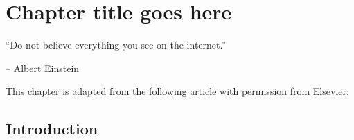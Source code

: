 \chapter{Chapter title goes here} \label{chap:chap-2}



\epigraph{\enquote{Do not believe everything you see on the internet.}}{-- Albert Einstein}




\begin{onehalfspace}    
    This chapter is adapted from the following article with permission from Elsevier:
    
\end{onehalfspace}




\section{Introduction}
\blindtext




\blindtext
